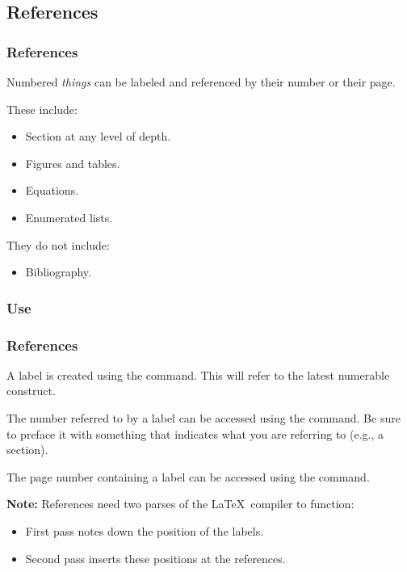 \subsection{References}
\begin{frame}[fragile]
  \frametitle{References}
  \vspace{3mm}
  Numbered \textsl{things} can be labeled and referenced by their number or their page.
  
  \vspace{5mm}
  These include:
  \begin{itemize}
    \item Section at any level of depth.
    \item Figures and tables.
    \item Equations.
    \item Enumerated lists.
  \end{itemize}
  
  \vspace{5mm}
  They do not include:
  \begin{itemize}
    \item Bibliography.
  \end{itemize}
\end{frame}

\subsubsection{Use}
\begin{frame}[fragile]
  \frametitle{References }
  \vspace{3mm}
  A label is created using the  command. This will refer to the latest numerable construct.
  
  \vspace{5mm}
  The number referred to by a label can be accessed using the  command. Be sure to preface it with something that indicates what you are referring to (e.g., a section).
  
  \vspace{5mm}
  The page number containing a label can be accessed using the  command.
  
  \vspace{5mm}
  \textbf{Note:} References need two parses of the \LaTeX\ compiler to function:
  \begin{itemize}
    \item First pass notes down the position of the labels.
    \item Second pass inserts these positions at the references.
  \end{itemize}
\end{frame}

